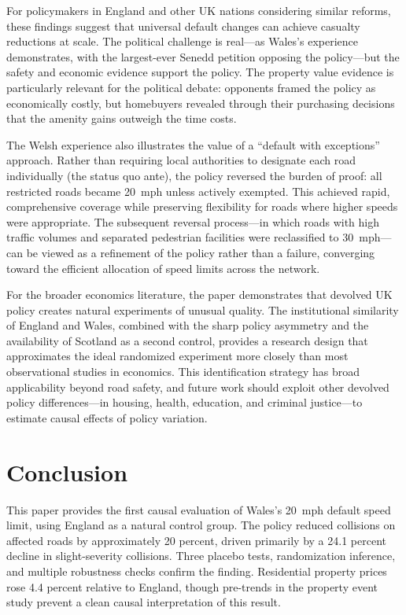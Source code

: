 \documentclass[12pt]{article}
\begin{document}
For policymakers in England and other UK nations considering similar reforms, these findings suggest that universal default changes can achieve casualty reductions at scale. The political challenge is real---as Wales's experience demonstrates, with the largest-ever Senedd petition opposing the policy---but the safety and economic evidence support the policy. The property value evidence is particularly relevant for the political debate: opponents framed the policy as economically costly, but homebuyers revealed through their purchasing decisions that the amenity gains outweigh the time costs.

The Welsh experience also illustrates the value of a ``default with exceptions'' approach. Rather than requiring local authorities to designate each road individually (the status quo ante), the policy reversed the burden of proof: all restricted roads became 20~mph unless actively exempted. This achieved rapid, comprehensive coverage while preserving flexibility for roads where higher speeds were appropriate. The subsequent reversal process---in which roads with high traffic volumes and separated pedestrian facilities were reclassified to 30~mph---can be viewed as a refinement of the policy rather than a failure, converging toward the efficient allocation of speed limits across the network.

For the broader economics literature, the paper demonstrates that devolved UK policy creates natural experiments of unusual quality. The institutional similarity of England and Wales, combined with the sharp policy asymmetry and the availability of Scotland as a second control, provides a research design that approximates the ideal randomized experiment more closely than most observational studies in economics. This identification strategy has broad applicability beyond road safety, and future work should exploit other devolved policy differences---in housing, health, education, and criminal justice---to estimate causal effects of policy variation.


\section{Conclusion}
\label{sec:conclusion}

This paper provides the first causal evaluation of Wales's 20~mph default speed limit, using England as a natural control group. The policy reduced collisions on affected roads by approximately 20 percent, driven primarily by a 24.1 percent decline in slight-severity collisions. Three placebo tests, randomization inference, and multiple robustness checks confirm the finding. Residential property prices rose 4.4 percent relative to England, though pre-trends in the property event study prevent a clean causal interpretation of this result.
\end{document}
